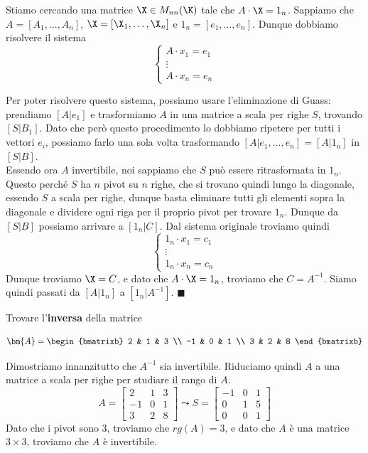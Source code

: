 \documentclass[11pt, a4paper, titlepage, oneside]{scrbook}
\begin{document}
\Dimostrazione \nopagebreak

Stiamo cercando una matrice $\X \in M_{nn}(\K)$ tale che $A \cdot \X = 1_n$. Sappiamo che $A = [A_1, \ldots, A_n]$, $\X = [\X_1, \ldots, \X_n]$ e  $1_n = [e_1, \ldots, e_n]$. Dunque dobbiamo risolvere il sistema
\[
\begin{cases}
A \cdot x_1 = e_1 \\
\vdots \\
A \cdot x_n  = e_n
\end{cases}
\]

Per poter risolvere questo sistema, possiamo usare l'eliminazione di Guass: prendiamo $[A|e_1]$ e trasformiamo $A$ in una matrice a scala per righe $S$, trovando $[S|B_1]$. Dato che però questo procedimento lo dobbiamo ripetere per tutti i vettori $e_i$, possiamo farlo una sola volta trasformando $[A|e_1, \ldots, e_n] = [A|1_n]$ in $[S|B]$. \\
Essendo ora $A$ invertibile, noi sappiamo che $S$ può essere ritrasformata in $1_n$. Questo perché $S$ ha $n$ pivot su $n$ righe, che si trovano quindi lungo la diagonale, essendo $S$ a scala per righe, dunque basta eliminare tutti gli elementi sopra la diagonale e dividere ogni riga per il proprio pivot per trovare $1_n$. Dunque da $[S|B]$ possiamo arrivare a $[1_n | C]$. Dal sistema originale troviamo quindi
\[
\begin{cases}
1_n \cdot x_1 = c_1 \\
\vdots \\
1_n \cdot x_n = c_n
\end{cases}
\]
Dunque troviamo $\X = C$, e dato che $A \cdot \X = 1_n$, troviamo che $C = A^{-1}$. Siamo quindi passati da $[A|1_n]$ a $[1_n|A^{-1}]$. $\blacksquare$

\Esempio \nopagebreak

Trovare l'\textbf{inversa} della matrice \nopagebreak

\[ \bm{A} = 
\begin{bmatrixb}
2 & 1 & 3 \\
-1 & 0 & 1 \\
3 & 2 & 8 
\end{bmatrixb}
\]

Dimostriamo innanzitutto che $A^{-1}$ sia invertibile. Riduciamo quindi $A$ a una matrice a scala per righe per studiare il rango di $A$.
\[
A = \begin{bmatrix}
    2 & 1 & 3 \\
    -1 & 0 & 1 \\
    3 & 2 & 8
\end{bmatrix}
\leadsto 
S = \begin{bmatrix}
    -1 & 0 & 1 \\
    0 & 1 & 5 \\
    0 & 0 & 1
\end{bmatrix}
\] 
Dato che i pivot sono $3$, troviamo che $rg(A) = 3$, e dato che $A$ è una matrice $3 \times 3$, troviamo che $A$ è invertibile.
\end{document}
